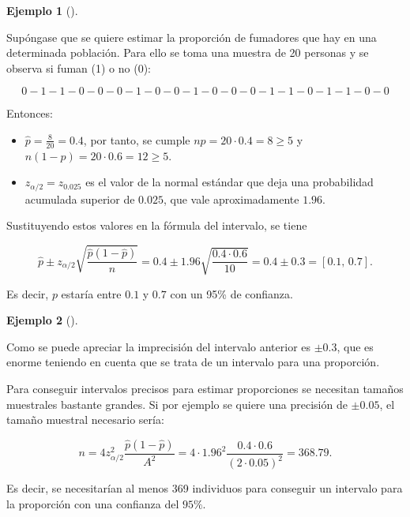 \documentclass[
  spanish,
  a4paper,
]{scrreport}
\providecommand{\tightlist}{%
  \setlength{\itemsep}{0pt}\setlength{\parskip}{0pt}}
\theoremstyle{plain}
\theoremstyle{definition}
\newtheorem{example}{Ejemplo}[chapter]
\theoremstyle{definition}
\theoremstyle{remark}
\begin{document}
\begin{example}[]\protect\hypertarget{exm-intervalo-confianza-proporcion}{}\label{exm-intervalo-confianza-proporcion}

Supóngase que se quiere estimar la proporción de fumadores que hay en
una determinada población. Para ello se toma una muestra de 20 personas
y se observa si fuman (1) o no (0):

\[
0 - 1 - 1 - 0 - 0 - 0 - 1 - 0 - 0 - 1 - 0 - 0 - 0 - 1 - 1- 0 - 1 - 1 - 0 - 0
\]

Entonces:

\begin{itemize}
\tightlist
\item
  \(\hat p=\frac{8}{20}=0.4\), por tanto, se cumple
  \(np=20\cdot 0.4 = 8\geq 5\) y \(n(1-p)=20\cdot 0.6= 12\geq 5\).
\item
  \(z_{\alpha/2}=z_{0.025}\) es el valor de la normal estándar que deja
  una probabilidad acumulada superior de \(0.025\), que vale
  aproximadamente \(1.96\).
\end{itemize}

Sustituyendo estos valores en la fórmula del intervalo, se tiene

\[
\hat{p}\pm z_{\alpha/2}\sqrt{\frac{\hat{p}(1-\hat{p})}{n}} = 0.4\pm 1.96\sqrt{\frac{0.4\cdot 0.6}{10}} = 0.4\pm  0.3 = \left[0.1,\,0.7\right].
\]

Es decir, \(p\) estaría entre \(0.1\) y \(0.7\) con un 95\% de
confianza.

\end{example}

\begin{example}[]\protect\hypertarget{exm-tamaño-muestral-intervalo-confianza-proporcion}{}\label{exm-tamaño-muestral-intervalo-confianza-proporcion}

Como se puede apreciar la imprecisión del intervalo anterior es
\(\pm 0.3\), que es enorme teniendo en cuenta que se trata de un
intervalo para una proporción.

Para conseguir intervalos precisos para estimar proporciones se
necesitan tamaños muestrales bastante grandes. Si por ejemplo se quiere
una precisión de \(\pm 0.05\), el tamaño muestral necesario sería:

\[
n= 4 z_{\alpha/2}^2\frac{\hat{p}(1-\hat{p})}{A^2}=4\cdot 1.96^2\frac{0.4\cdot 0.6}{(2\cdot0.05)^2}= 368.79.
\]

Es decir, se necesitarían al menos 369 individuos para conseguir un
intervalo para la proporción con una confianza del \(95\%\).

\end{example}
\end{document}
